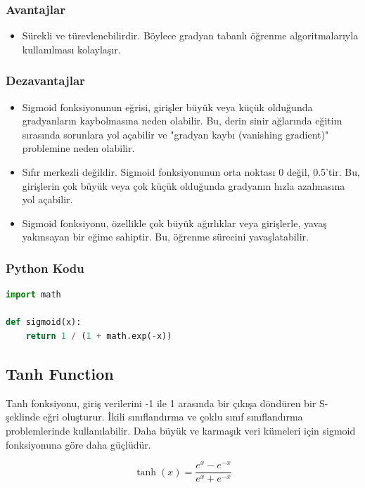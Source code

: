 \subsubsection{Avantajlar}
\begin{itemize}
    \item Sürekli ve türevlenebilirdir. Böylece gradyan tabanlı öğrenme algoritmalarıyla kullanılması kolaylaşır.
\end{itemize}

\subsubsection{Dezavantajlar}
\begin{itemize}
    \item Sigmoid fonksiyonunun eğrisi, girişler büyük veya küçük olduğunda gradyanların kaybolmasına neden olabilir. Bu, derin sinir ağlarında eğitim sırasında sorunlara yol açabilir ve "gradyan kaybı (vanishing gradient)" problemine neden olabilir.
    \item Sıfır merkezli değildir. Sigmoid fonksiyonunun orta noktası 0 değil, 0.5'tir. Bu, girişlerin çok büyük veya çok küçük olduğunda gradyanın hızla azalmasına yol açabilir.
    \item Sigmoid fonksiyonu, özellikle çok büyük ağırlıklar veya girişlerle, yavaş yakınsayan bir eğime sahiptir. Bu, öğrenme sürecini yavaşlatabilir.
\end{itemize}

\subsubsection{Python Kodu}

\begin{lstlisting}[language=Python]
import math

def sigmoid(x):
    return 1 / (1 + math.exp(-x))
\end{lstlisting}

\newpage

\subsection{Tanh Function}
Tanh fonksiyonu, giriş verilerini -1 ile 1 arasında bir çıkışa döndüren bir S-şeklinde eğri oluşturur. İkili sınıflandırma ve çoklu sınıf sınıflandırma problemlerinde kullanılabilir. Daha büyük ve karmaşık veri kümeleri için sigmoid fonksiyonuna göre daha güçlüdür.

\[\tanh(x) = \frac{e^{x} - e^{-x}}{e^{x} + e^{-x}}\]

